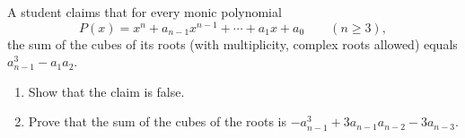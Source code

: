 A student claims that for every monic polynomial
\[
P(x)=x^n+a_{n-1}x^{n-1}+\cdots+a_1x+a_0\qquad(n\ge3),
\]
the sum of the cubes of its roots (with multiplicity, complex roots allowed) equals $a_{n-1}^3-a_1a_2$.
\begin{enumerate}
\item[(a)] Show that the claim is false.
\item[(b)] Prove that the sum of the cubes of the roots is $-a_{n-1}^3+3a_{n-1}a_{n-2}-3a_{n-3}$.
\end{enumerate}
